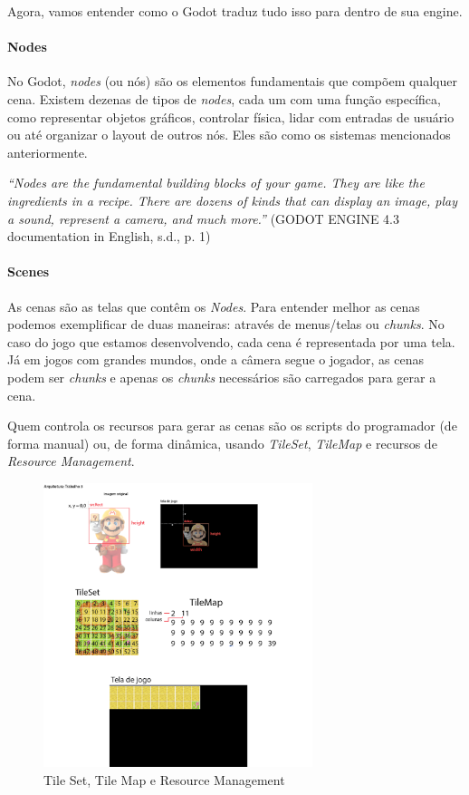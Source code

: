 Agora, vamos entender como o Godot traduz tudo isso para dentro de sua engine.

\paragraph{Nodes}

No Godot, \textit{nodes} (ou nós) são os elementos fundamentais que compõem qualquer cena. Existem dezenas de tipos de \textit{nodes}, cada um com uma função específica, como representar objetos gráficos, controlar física, lidar com entradas de usuário ou até organizar o layout de outros nós. Eles são como os sistemas mencionados anteriormente.

\begin{flushright}
\textit{“Nodes are the fundamental building blocks of your game. They are like the ingredients in a recipe. There are dozens of kinds that can display an image, play a sound, represent a camera, and much more.”}
(GODOT ENGINE 4.3 documentation in English, s.d., p. 1)
\end{flushright}

\paragraph{Scenes}

As cenas são as telas que contêm os \textit{Nodes}. Para entender melhor as cenas podemos exemplificar de duas maneiras: através de menus/telas ou \textit{chunks}. No caso do jogo que estamos desenvolvendo, cada cena é representada por uma tela. Já em jogos com grandes mundos, onde a câmera segue o jogador, as cenas podem ser \textit{chunks} e apenas os \textit{chunks} necessários são carregados para gerar a cena. 

Quem controla os recursos para gerar as cenas são os scripts do programador (de forma manual) ou, de forma dinâmica, usando \textit{TileSet}, \textit{TileMap} e recursos de \textit{Resource Management}.

\begin{figure}[htbp]
    \centering
    \caption{Tile Set, Tile Map e Resource Management}
    \label{fig:tiles}
    \includegraphics[width=0.7\textwidth]{figuras/tile-map-cic.png}
\end{figure}